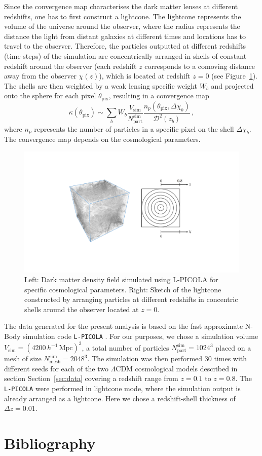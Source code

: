 \documentclass[final,twocolumn,3p,times,sort&compress]{elsarticle}
\newcommand{\figref}[1]{Figure~\ref{fig:#1}}
\newcommand{\secref}[1]{Section~\ref{sec:#1}}
\newcommand{\1}{\b{1}}              %
\newcommand{\0}{\b{0}}              %
\newcommand{\pkg}[1]{\texttt{#1}}
\begin{document}
Since the convergence map characterises the dark matter lenses at different redshifts, one has to first construct a lightcone. The lightcone represents the volume of the universe around the observer, where the radius represents the distance the light from distant galaxies at different times and locations has to travel to the observer. Therefore, the particles outputted at different redshifts (time-steps) of the simulation are concentrically arranged in shells of constant redshift around the observer (each redshift $z$ corresponds to a comoving distance away from the observer $\chi(z)$), which is located at redshift $z=0$ (see \figref{sketch_lightcone_simulation}). The shells are then weighted by a weak lensing specific weight $W_b$ and projected onto the sphere for each pixel $\theta_\mathrm{pix}$, resulting in a convergence map
\begin{equation}
\kappa (\theta_\mathrm{pix}) \sim \sum_b W_b \frac{V_\mathrm{sim}}{N_\mathrm{part}^\mathrm{sim}} \frac{n_p (\theta_\mathrm{pix}, \Delta \chi_b)}{\mathcal{D}^2 (z_b)}  \, ,
\end{equation}
where $n_p$ represents the number of particles in a specific pixel on the shell $\Delta \chi_b$. The convergence map depends on the cosmological parameters.

\begin{figure}[ht!]
	\centering
	\includegraphics[width=\linewidth]{sketch_lightcone_simulation}
	\caption{Left: Dark matter density field simulated using L-PICOLA for specific cosmological parameters. Right: Sketch of the lightcone constructed by arranging particles at different redshifts in concentric shells around the observer located at $z=0$.}
	\label{fig:sketch_lightcone_simulation}
\end{figure}

The data generated for the present analysis is based on the fast approximate N-Body simulation code \pkg{L-PICOLA} \citep{howlett2015lpicola}. For our purposes, we chose a simulation volume $V_\mathrm{sim} = (4200 \, h^{-1}\, \mathrm{Mpc})^3$, a total number of particles $N_\mathrm{part}^\mathrm{sim} = 1024^3$ placed on a mesh of size $N_\mathrm{mesh}^\mathrm{sim} = 2048^3$. The simulation was then performed 30 times with different seeds for each of the two $\Lambda$CDM cosmological models described in section \secref{data} covering a redshift range from $z = 0.1$ to $z = 0.8$. The \pkg{L-PICOLA} were performed in lightcone mode, where the simulation output is already arranged as a lightcone. Here we chose a redshift-shell thickness of $\Delta z = 0.01$.

\section*{Bibliography}


\end{document}

